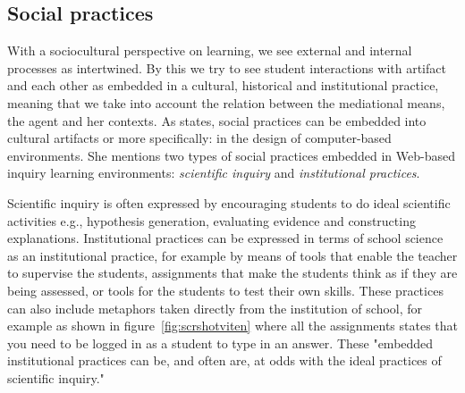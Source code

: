 \subsection{Social practices}
With a sociocultural perspective on learning, we see external and internal processes as intertwined. By this we try to see student interactions with artifact and each other as embedded in a cultural, historical and institutional practice, meaning that we take into account the relation between the mediational means, the agent and her contexts. As \citet{furberg2009socio} states, social practices can be embedded into cultural artifacts or more specifically: in the design of computer-based environments. She mentions two types of social practices embedded in Web-based inquiry learning environments: \emph{scientific inquiry} and \emph{institutional practices}.  

Scientific inquiry is often expressed by encouraging students to do ideal scientific activities e.g., hypothesis generation, evaluating evidence and constructing explanations. Institutional practices can be expressed in terms of school science as an institutional practice, for example by means of tools that enable the teacher to supervise the students, assignments that make the students think as if they are being assessed, or tools for the students to test their own skills. These practices can also include metaphors taken directly from the institution of school, for example as shown in figure~\ref{fig:scrshotviten} where all the assignments states that you need to be logged in as a student to type in an answer. These "embedded institutional practices can be, and often are, at odds with the ideal practices of scientific inquiry." \citetext{\citealp{chinn2002epistemologically}, referenced in \citealp{furberg2009socio}, p. 400}

